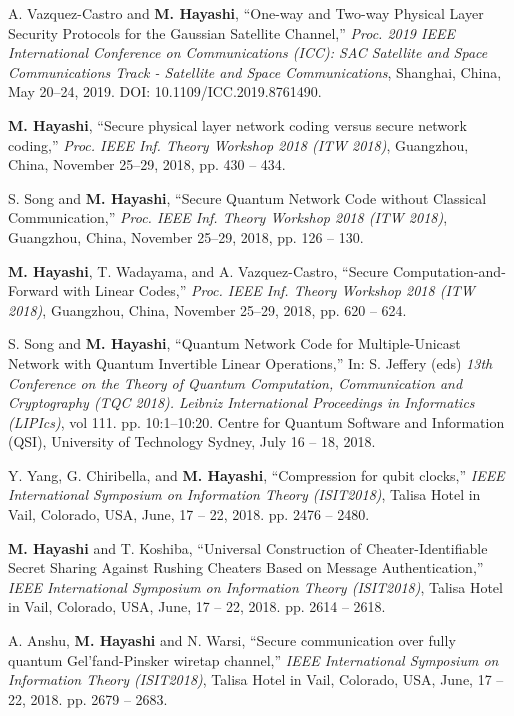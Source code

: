 \documentclass[a4paper,12pt,oneside]{article}
\begin{document}
\begin{enumerate}
A. Vazquez-Castro and \textbf{M. Hayashi}, 
``One-way and Two-way Physical Layer Security Protocols for the Gaussian Satellite Channel,'' 
{\em Proc. 2019 IEEE International Conference on Communications (ICC): SAC Satellite and Space Communications Track - Satellite and Space Communications},
Shanghai, China, May 20--24, 2019. DOI: 10.1109/ICC.2019.8761490.

\textbf{M. Hayashi}, 
``Secure physical layer network coding versus secure network coding,''
{\em Proc. IEEE Inf. Theory Workshop 2018 (ITW 2018)}, 
Guangzhou, China, November 25--29, 2018, pp. 430 -- 434. 

S. Song and \textbf{M. Hayashi}, 
``Secure Quantum Network Code without Classical Communication,''
{\em Proc. IEEE Inf. Theory Workshop 2018 (ITW 2018)}, 
Guangzhou, China, November 25--29, 2018, pp. 126 -- 130. 

\textbf{M. Hayashi}, T. Wadayama, and A. Vazquez-Castro,
``Secure Computation-and-Forward with Linear Codes,''
{\em Proc. IEEE Inf. Theory Workshop 2018 (ITW 2018)}, 
Guangzhou, China, November 25--29, 2018, pp. 620 -- 624. 

S. Song and \textbf{M. Hayashi}, 
``Quantum Network Code for Multiple-Unicast Network with Quantum Invertible Linear Operations,''
In: S. Jeffery (eds) 
{\em 13th Conference on the Theory of Quantum Computation, Communication and Cryptography (TQC 2018). Leibniz International Proceedings in Informatics (LIPIcs)},
 vol 111. pp. 10:1--10:20.
Centre for Quantum Software and Information (QSI), University of Technology Sydney, 
July 16 -- 18, 2018.

Y. Yang, G. Chiribella, and \textbf{M. Hayashi},
``Compression for qubit clocks,''
{\em IEEE International Symposium on Information Theory (ISIT2018)}, 
Talisa Hotel in Vail, Colorado, USA, June, 17 -- 22, 2018.
pp. 2476 -- 2480.

 \textbf{M. Hayashi} and T. Koshiba,
``Universal Construction of Cheater-Identifiable Secret Sharing Against Rushing Cheaters Based on Message Authentication,''
{\em IEEE International Symposium on Information Theory (ISIT2018)}, 
 Talisa Hotel in Vail, Colorado, USA, June, 17 -- 22, 2018.
pp. 2614 -- 2618.

A. Anshu, \textbf{M. Hayashi} and N. Warsi,
``Secure communication over fully quantum Gel'fand-Pinsker wiretap channel,''
{\em IEEE International Symposium on Information Theory (ISIT2018)}, 
 Talisa Hotel in Vail, Colorado, USA, June, 17 -- 22, 2018.
pp. 2679 -- 2683. 


\end{enumerate}
\end{document}
